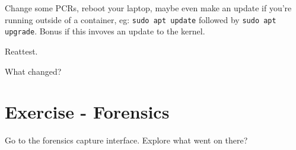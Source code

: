 \documentclass[10pt,a4paper]{article}
\begin{document}
Change some PCRs, reboot your laptop, maybe even make an update if you're running outside of a container, eg:  \texttt{sudo apt update} followed by \texttt{sudo apt upgrade}.  Bonus if this invoves an update to the kernel.

Reattest.

What changed?

\section{Exercise - Forensics}
Go to the forensics capture interface. Explore what went on there?
\end{document}

